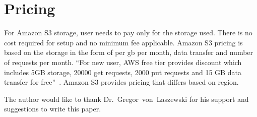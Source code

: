 \section{Pricing}

For Amazon S3 storage, user needs to pay only for the storage used. There is no
cost required for setup and no minimum fee applicable. Amazon S3 pricing is
based on the storage in the form of per gb per month, data transfer and number
of requests per month.
``For new user, AWS free tier provides discount which includes 5GB storage,
20000 get requests, 2000 put requests and 15 GB data transfer for
free''~\cite{hid-sp18-420-amazon-S3-pricing}. Amazon S3 provides pricing that
differs based on region.


\begin{acks}

  The author would like to thank Dr.~Gregor~von~Laszewski for his
  support and suggestions to write this paper.

\end{acks}


 
